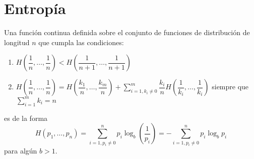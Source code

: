 \section{Entropía}

\begin{teo}
    Una función continua definida sobre el conjunto de funciones de distribución de longitud $n$ que cumpla las condiciones:

    \begin{enumerate}[label=(\arabic*)]
        \item\label{item:l1-i1} $H\left(\dfrac{1}{n},\dots,\dfrac{1}{n}\right) < H\left(\dfrac{1}{n+1},\dots,\dfrac{1}{n+1}\right)$
        \item\label{item:l1-i2} $\displaystyle H\left(\dfrac{1}{n},\dots,\dfrac{1}{n}\right) = H\left(\dfrac{k_1}{n},\dots,\dfrac{k_m}{n}\right)+\sum_{i=1, k_i\neq 0}^m\dfrac{k_i}{n}H\left(\dfrac{1}{k_i},\dots,\dfrac{1}{k_i}\right)$ siempre que $\displaystyle \sum_{i=1}^mk_i=n$
    \end{enumerate}
    es de la forma
    $$H(p_1,\dots,p_n)=\sum_{i=1, p_i\ne 0}^np_i\log_b\left(\dfrac{1}{p_i}\right)=-\sum_{i=1, p_i\ne 0}^np_i\log_bp_i$$
    para algún $b>1$. 
\end{teo}

